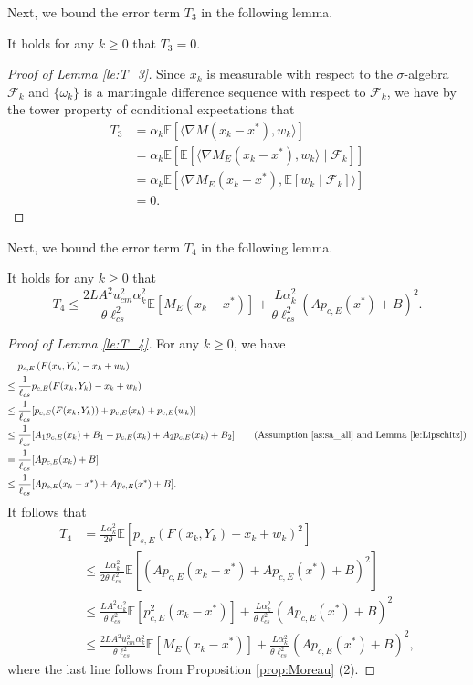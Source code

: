 \documentclass[11 pt]{article}
\begin{document}
	Next, we bound the error term $T_3$ in the following lemma.
	\begin{lemma}\label{le:T_3}
		It holds for any $k\geq 0$ that $T_3=0$.
	\end{lemma}
	\begin{proof}[Proof of Lemma \ref{le:T_3}]
		Since $x_k$ is measurable with respect to the $\sigma$-algebra $\mathcal{F}_k$ and $\{\omega_k\}$ is a martingale difference sequence with respect to $\mathcal{F}_k$, we have by the tower property of conditional expectations that
		\begin{align*}
			T_3&= \alpha_k \mathbb{E}\left[\langle\nabla M(x_k-x^*),w_k\rangle\right]\\
			&= \alpha_k \mathbb{E}\left[\mathbb{E}[\langle\nabla M_E(x_k-x^*),w_k\rangle\mid \mathcal{F}_k]\right]\\
			&= \alpha_k \mathbb{E}\left[\langle\nabla M_E(x_k-x^*),\mathbb{E}[w_k\mid \mathcal{F}_k]\rangle\right]\\
			&=0.
		\end{align*}
	\end{proof}
	
	
	Next, we bound the error term $T_4$ in the following lemma.
	\begin{lemma}\label{le:T_4}
		It holds for any $k\geq 0$ that $$T_4 \leq \frac{2LA^2u_{cm}^2\alpha_k^2}{\theta\ell_{cs}^2}\mathbb{E}\left[M_E(x_k-x^*)\right]+\frac{L\alpha_k^2}{\theta\ell_{cs}^2}\left(Ap_{c,E}(x^*)+B\right)^2.$$
	\end{lemma}
	\begin{proof}[Proof of Lemma \ref{le:T_4}]
		For any $k\geq 0$, we have
		\begin{align*}
			&p_{s,E}\left(F(x_k,Y_k)-x_k+w_k\right)\\
			\leq\;& \frac{1}{\ell_{cs}}p_{c,E}(F(x_k,Y_k)-x_k+w_k) \\
			\leq\;& \frac{1}{\ell_{cs}}[p_{c,E}(F(x_k,Y_k))+p_{c,E}(x_k)+p_{c,E}(w_k)]\\
			\leq\;& \frac{1}{\ell_{cs}}[A_1p_{c,E}(x_k)+B_1+p_{c,E}(x_k)+A_2p_{c,E}(x_k)+B_2]\tag{Assumption \ref{as:sa_all} and Lemma \ref{le:Lipschitz}}\\
			=\;& \frac{1}{\ell_{cs}}[Ap_{c,E}(x_k)+B]\\
			\leq\;& \frac{1}{\ell_{cs}}[Ap_{c,E}(x_k-x^*)+Ap_{c,E}(x^*)+B].
		\end{align*}
		It follows that
		\begin{align*}
			T_4&=\frac{L\alpha_k^2}{2\theta}\mathbb{E}\left[p_{s,E}(F(x_k,Y_k)-x_k+w_k)^2\right]\\
			&\leq \frac{L\alpha_k^2}{2\theta\ell_{cs}^2}\mathbb{E}\left[(Ap_{c,E}(x_k-x^*)+Ap_{c,E}(x^*)+B)^2\right]\\
			&\leq \frac{LA^2\alpha_k^2}{\theta\ell_{cs}^2}\mathbb{E}\left[p^2_{c,E}(x_k-x^*)\right]+\frac{L\alpha_k^2}{\theta\ell_{cs}^2}\left(Ap_{c,E}(x^*)+B\right)^2\\
			&\leq \frac{2LA^2u_{cm}^2\alpha_k^2}{\theta\ell_{cs}^2}\mathbb{E}\left[M_E(x_k-x^*)\right]+\frac{L\alpha_k^2}{\theta\ell_{cs}^2}\left(Ap_{c,E}(x^*)+B\right)^2,
		\end{align*}
		where the last line follows from Proposition \ref{prop:Moreau} (2).
	\end{proof}
	
\end{document}
